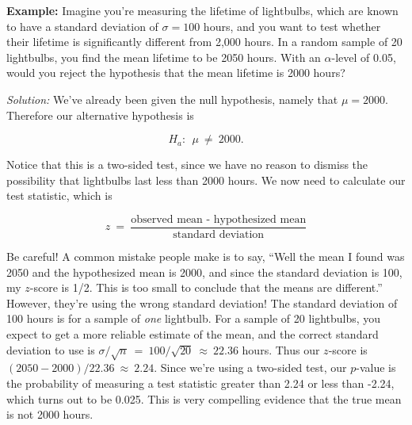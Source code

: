 \textbf{Example:} \ex Imagine you're measuring the lifetime of lightbulbs, which are known to have a standard deviation of $\sigma=100$ hours, and you want to test whether their lifetime is significantly different from 2,000 hours. In a random sample of 20 lightbulbs, you find the mean lifetime to be 2050 hours. With an $\alpha$-level of 0.05, would you reject the hypothesis that the mean lifetime is 2000 hours?



\emph{Solution:}  We've already been given the null hypothesis, namely that $\mu = 2000$.  Therefore our alternative hypothesis is

\begin{equation*}

H_a:\ \ \mu\ \neq \ 2000.

\end{equation*}

Notice that this is a two-sided test, since we have no reason to dismiss the possibility that lightbulbs last less than 2000 hours.  We now need to calculate our test statistic, which is

\begin{equation*}

z\ = \ \frac{\textrm{observed mean - hypothesized mean}}{\textrm{standard deviation}}

\end{equation*}



Be careful!  A common mistake people make is to say, ``Well the mean I found was 2050 and the hypothesized mean is 2000, and since the standard deviation is 100, my $z$-score is 1/2.  This is too small to conclude that the means are different.'' However, they're using the wrong standard deviation! The standard deviation of 100 hours is for a sample of \emph{one} lightbulb. For a sample of 20 lightbulbs, you expect to get a more reliable estimate of the mean, and the correct standard deviation to use is $\sigma/\sqrt{n}\ = \ 100/\sqrt{20}\ \approx \ 22.36$ hours. Thus our $z$-score is $\left(2050-2000\right)/22.36\ \approx \ 2.24$.  Since we're using a two-sided test, our $p$-value is the probability of measuring a test statistic greater than 2.24 or less than -2.24, which turns out to be 0.025.  This is very compelling evidence that the true mean is not 2000 hours.



\ \\



